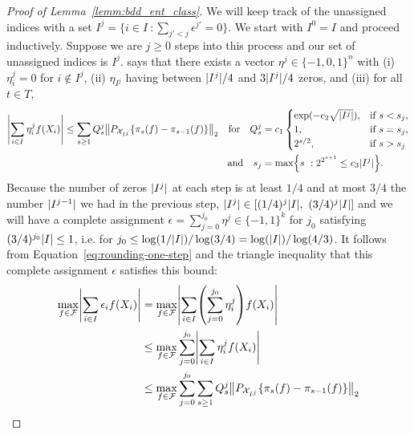 \documentclass{article}
\DeclarePairedDelimiter\norm{\lVert}{\rVert}
\DeclarePairedDelimiter\abs{\lvert}{\rvert}
\DeclarePairedDelimiter\cb{\{}{\}}
\DeclarePairedDelimiter\p{(}{)}
\theoremstyle{definition}
\newcommand{\calF}{\ensuremath{\mathcal{F}}}
\newcommand{\calX}{\ensuremath{\mathcal{X}}}
\newcommand{\<}{\langle}
\renewcommand{\>}{\rangle}
\begin{document}
\begin{refsection}
\begin{proof}[Proof of Lemma~\ref{lemm:bdd_ent_class}]
We will keep track of the unassigned indices with a set $I^j=\{i \in I \ : \sum_{j'<j}\epsilon^{j'} = 0\}$. We start with $I^0 = I$ and proceed inductively. Suppose we are $j \ge 0$ steps into this process and our set of unassigned indices is $I^j$. \citet[Corollary 3.4]{mendelson2011discrepancy} says that there exists a vector $\eta^j \in \{-1,0,1\}^{n}$ with (i) $\eta_i^j = 0$ for $i \notin I^j$, (ii) $\eta_{I^j}$ having between $\abs{I^j}/4$ and $3\abs{I^j}/4$ zeros, and (iii) for all $t \in T$,
\begin{equation}
\label{eq:rounding-one-step}
\begin{aligned}
\abs*{\sum_{i \in I} \eta_i^j f(X_i)} \leq \sum_{s\geq 1} Q^j_s\norm*{P_{\calX_{I^j}}\{\pi_s(f) - \pi_{s-1}(f)\}}_2
\quad \text{for} \quad
Q^j_s &= c_1 \begin{cases}
  \exp(-c_2 \sqrt{\abs{I^j}}), &\text{if } s<s_{j},\\
  1, &\text{if } s = s_{j},\\
  2^{s/2}, &\text{if } s>s_{j}
\end{cases} \\
\quad \text{and} \quad
s_{j} &= \max\cb*{s \ : 2^{2^{s+1}}\leq c_3\abs{I^j} }.
\end{aligned}
\end{equation}
Because the number of zeros $\abs{I^j}$ at each step is at least $1/4$ and at most $3/4$ the number $\abs{I^{j-1}}$ we had in the previous step, $\abs{I^j} \in [ (1/4)^j \abs{I}, \ (3/4)^j \abs{I}]$ and we will have a complete assignment $\epsilon = \sum_{j=0}^{j_0} \eta^j \in \{-1,1\}^k$ for $j_0$ satisfying $(3/4)^{j_0} \abs{I} \le 1$, i.e. for $j_0 \le \log(1/\abs{I})/\log(3/4) = \log(\abs{I})/\log(4/3)$.
It follows from Equation~\ref{eq:rounding-one-step} and the triangle inequality that this complete assignment $\epsilon$ satisfies this bound:
\begin{equation}
\label{eq:sum-over-stages-discrepancy-bound}
\begin{aligned}
\max_{f \in \calF}\abs*{\sum_{i \in I} \epsilon_i f(X_i)}
&= \max_{f \in \calF}\abs*{\sum_{i \in I} \p*{\sum_{j=0}^{j_0} \eta_i^{j}} f(X_i)} \\
&\le  \max_{f \in \calF}\sum_{j=0}^{j_0}\abs*{\sum_{i \in I} \eta_i^{j} f(X_i)} \\
&\le \max_{f \in \calF} \sum_{j=0}^{j_0} \sum_{s\geq 1}  Q^{j}_s\norm*{P_{\calX_{I^j}}\{\pi_s(f) - \pi_{s-1}(f)\}}_2 \\
\end{aligned}
\end{equation}


\end{proof}
\end{refsection}
\end{document}
